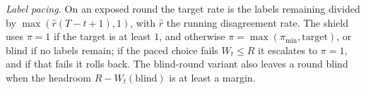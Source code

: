 \documentclass[10pt]{article}
\theoremstyle{plain}
\theoremstyle{definition}
\begin{document}
\emph{Label pacing.} On an exposed round the target rate is the labels remaining divided by $\max(\hat r(T-t+1),1)$, with $\hat r$ the running disagreement rate. The shield uses $\pi=1$ if the target is at least $1$, and otherwise $\pi=\max(\pi_{\min},\text{target})$, or blind if no labels remain; if the paced choice fails $W_t\le R$ it escalates to $\pi=1$, and if that fails it rolls back. The blind-round variant also leaves a round blind when the headroom $R-W_t(\text{blind})$ is at least a margin.

\end{document}

